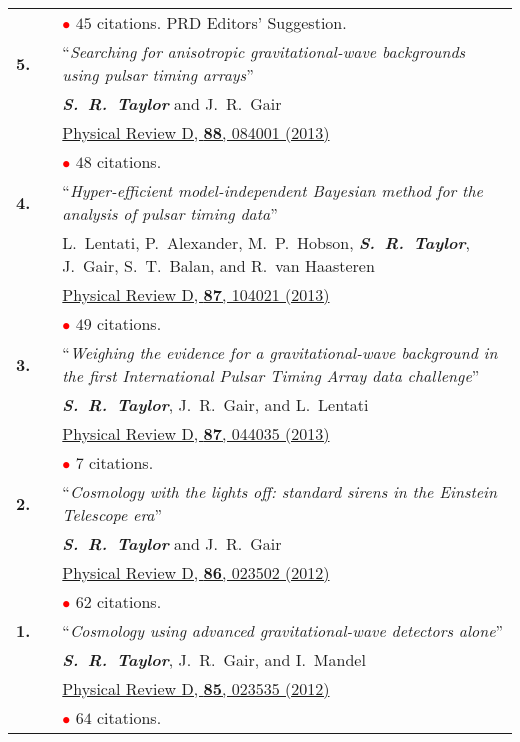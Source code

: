 \documentclass[11pt,letterpaper,sans]{moderncv}
\begin{document}
{\begin{longtable}{rp{0.3cm}p{15.8cm}}
&& \textcolor{red}{$\bullet$} $45$ citations. PRD Editors' Suggestion.\vspace{0.09cm}\\
\textbf{5.} & & ``\textit{Searching for anisotropic gravitational-wave backgrounds using pulsar timing arrays}'' \\ 
&& \textit{\textbf{S.~R.~Taylor}} and J.~R.~Gair \\ 
&& \href{http://journals.aps.org/prd/abstract/10.1103/PhysRevD.88.084001}{{\color{color1} Physical Review D, \textbf{88}, 084001 (2013)}} \\
&& \textcolor{red}{$\bullet$} $48$ citations. \vspace{0.09cm}\\
\textbf{4.} & & ``\textit{Hyper-efficient model-independent Bayesian method for the analysis of pulsar timing data}'' \\ 
&& L.~Lentati, P.~Alexander, M.~P.~Hobson, \textit{\textbf{S.~R.~Taylor}}, J.~Gair, S.~T.~Balan, and R.~van Haasteren \\ 
&& \href{http://journals.aps.org/prd/abstract/10.1103/PhysRevD.87.104021}{{\color{color1} Physical Review D, \textbf{87}, 104021 (2013)}} \\
&& \textcolor{red}{$\bullet$} $49$ citations. \vspace{0.09cm}\\
\textbf{3.} & & ``\textit{Weighing the evidence for a gravitational-wave background in the first International Pulsar Timing Array data challenge}'' \\ 
&& \textit{\textbf{S.~R.~Taylor}}, J.~R.~Gair, and L.~Lentati \\ 
&& \href{http://journals.aps.org/prd/abstract/10.1103/PhysRevD.87.044035}{{\color{color1} Physical Review D, \textbf{87}, 044035 (2013)}} \\
&& \textcolor{red}{$\bullet$} $7$ citations. \vspace{0.09cm}\\
\textbf{2.} & & ``\textit{Cosmology with the lights off: standard sirens in the Einstein Telescope era}'' \\ 
&& \textit{\textbf{S.~R.~Taylor}} and J.~R.~Gair \\ 
&& \href{http://journals.aps.org/prd/abstract/10.1103/PhysRevD.86.023502}{{\color{color1} Physical Review D, \textbf{86}, 023502 (2012)}} \\
&& \textcolor{red}{$\bullet$} $62$ citations. \vspace{0.09cm}\\
\textbf{1.} & & ``\textit{Cosmology using advanced gravitational-wave detectors alone}'' \\ 
&& \textit{\textbf{S.~R.~Taylor}}, J.~R.~Gair, and I.~Mandel \\ 
&& \href{http://journals.aps.org/prd/abstract/10.1103/PhysRevD.85.023535}{{\color{color1} Physical Review D, \textbf{85}, 023535 (2012)}} \\
&& \textcolor{red}{$\bullet$} $64$ citations. \vspace{0.09cm}\\
\end{longtable}
}
\end{document}
